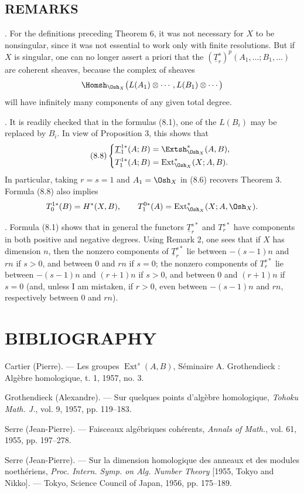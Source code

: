 \subsection*{REMARKS}

. For the definitions preceding Theorem 6, it was not necessary for
$X$ to be nonsingular, since it was not essential to work only with finite
resolutions. But if $X$ is singular, one can no longer assert a priori that the
$(\underline{T}_{r}^{s})^{p}(A_1,\ldots;B_1,\ldots)$ are coherent sheaves,
because the complex of sheaves
\[
  \Homsh_{\Osh_X}\bigl(L(A_1)\otimes\cdots,L(B_1)\otimes\cdots\bigr)
\]
will have infinitely many components of any given total degree.

\medskip
{}. It is readily checked that in the formulas (8.1), one of the
$L(B_i)$ may be replaced by $B_i$. In view of Proposition 3, this shows that
\begin{equation}\tag{8.8}
\left\{
\begin{aligned}
  \underline{T}_{1}^{1*}(A;B)&=\Extsh_{\Osh_X}^{*}(A,B),\\
  T_{1}^{1*}(A;B)&=\operatorname{Ext}_{\Osh_X}^{*}(X;A,B).
\end{aligned}
\right.
\end{equation}
In particular, taking $r=s=1$ and $A_1=\Osh_X$ in (8.6) recovers Theorem 3.
Formula (8.8) also implies
\[
  T_{0}^{1*}(B)=H^{*}(X,B),
  \qquad
  T_{1}^{0*}(A)=\operatorname{Ext}_{\Osh_X}^{*}(X;A,\Osh_X).
\]

\medskip
{}. Formula (8.1) shows that in general the functors
$\underline{T}_{r}^{s*}$ and $T_{r}^{s*}$ have components in both positive and
negative degrees. Using Remark 2, one sees that if $X$ has dimension $n$, then
the nonzero components of $\underline{T}_{r}^{s*}$ lie between $-(s-1)n$ and
$rn$ if $s>0$, and between $0$ and $rn$ if $s=0$; the nonzero components of
$T_{r}^{s*}$ lie between $-(s-1)n$ and $(r+1)n$ if $s>0$, and between $0$ and
$(r+1)n$ if $s=0$ (and, unless I am mistaken, if $r>0$, even between
$-(s-1)n$ and $rn$, respectively between $0$ and $rn$).

\section*{BIBLIOGRAPHY}

\noindent[1] Cartier (Pierre). --- Les groupes
$\operatorname{Ext}^{s}(A,B)$, Séminaire A. Grothendieck : Algèbre homologique,
t. 1, 1957, no. 3.

\noindent[2] Grothendieck (Alexandre). --- Sur quelques points d'algèbre
homologique, \emph{Tohoku Math. J.}, vol. 9, 1957, pp. 119--183.

\noindent[3] Serre (Jean-Pierre). --- Faisceaux algébriques cohérents,
\emph{Annals of Math.}, vol. 61, 1955, pp. 197--278.

\noindent[4] Serre (Jean-Pierre). --- Sur la dimension homologique des anneaux
et des modules noethériens, \emph{Proc. Intern. Symp. on Alg. Number Theory}
[1955, Tokyo and Nikko]. --- Tokyo, Science Council of Japan, 1956,
pp. 175--189.

\clearpage
